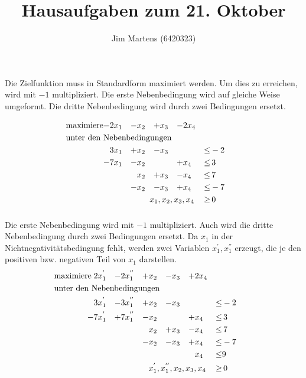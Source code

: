 \documentclass[10pt,a4paper,oneside,ngerman,numbers=noenddot]{scrartcl}
\begin{document}
\author{Jim Martens (6420323)}
\title{Hausaufgaben zum 21. Oktober}
\maketitle
\section{} %
	\subsection{} %
		\subsubsection{} %
		Die Zielfunktion muss in Standardform maximiert werden. Um dies zu erreichen, wird mit $-1$ multipliziert. Die erste Nebenbedingung wird auf gleiche Weise umgeformt. Die dritte Nebenbedingung wird durch zwei Bedingungen ersetzt.
		
		\begin{alignat*}{5}
		\text{maximiere} -& 2x_{1} &-& x_{2} &+& x_{3} &-& 2x_{4} && \\
		\multicolumn{10}{l}{\text{unter den Nebenbedingungen}} && \\
		& 3x_{1} &+& x_{2} &-& x_{3} && &\leq & -2 \\
		-& 7x_{1} &-& x_{2} && &+& x_{4} &\leq &\, 3 \\
		& && x_{2} &+& x_{3} &-& x_{4} &\leq &\, 7 \\
		& &-& x_{2} &-& x_{3} &+& x_{4} &\leq & -7 \\
		\multicolumn{8}{r}{$x_{1}, x_{2}, x_{3}, x_{4}$} \,&\geq &\, 0
		\end{alignat*}
		\subsubsection{} %
		Die erste Nebenbedingung wird mit $-1$ multipliziert. Auch wird die dritte Nebenbedingung durch zwei Bedingungen ersetzt. Da $x_{1}$ in der Nichtnegativitätsbedingung fehlt, werden zwei Variablen $x_{1}^{'}, x_{1}^{''}$ erzeugt, die je den positiven bzw. negativen Teil von $x_{1}$ darstellen.
		\begin{alignat*}{6}
		\text{maximiere}\; & 2x_{1}^{'} &-& 2x_{1}^{''} &+& x_{2} &-& x_{3} &+& 2x_{4} && \\
		\multicolumn{12}{l}{\text{unter den Nebenbedingungen}} && \\
		& 3x_{1}^{'} &-& 3x_{1}^{''} &+& x_{2} &-& x_{3} && &\leq & -2 \\
		-& 7x_{1}^{'} &+& 7x_{1}^{''} &-& x_{2} && &+& x_{4} &\leq &\, 3 \\
		& && && x_{2} &+& x_{3} &-& x_{4} &\leq &\, 7 \\
		& && &-& x_{2} &-& x_{3} &+& x_{4} &\leq & -7 \\
		& && && && && x_{4} &\leq & 9 \\
		\multicolumn{10}{r}{$x_{1}^{'}, x_{1}^{''}, x_{2}, x_{3}, x_{4}$} \,&\geq &\, 0
		\end{alignat*}
	\subsection{} %
\section{} %
\end{document}
